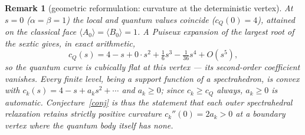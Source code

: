 \documentclass[11pt]{article}
\newtheorem{remark}[theorem]{Remark}
\begin{document}
\begin{remark}[geometric reformulation: curvature at the deterministic vertex]
At $s=0$ ($\alpha=\beta=1$) the local and quantum values coincide ($c_Q(0)=4$),
attained on the classical face $\langle A_0\rangle=\langle B_0\rangle=1$. A Puiseux
expansion of the largest root of the sextic gives, in exact arithmetic,
\[
  c_Q(s)=4-s+0\cdot s^2+\tfrac16 s^3-\tfrac1{36}s^4+O(s^5),
\]
so the quantum curve is \emph{cubically flat} at this vertex --- its second-order
coefficient vanishes. Every finite level, being a support function of a
spectrahedron, is convex with $c_k(s)=4-s+a_k s^2+\cdots$ and $a_k\ge0$; since
$c_k\ge c_Q$ always, $a_k\ge0$ is automatic. Conjecture~\ref{conj} is thus the
statement that each outer spectrahedral relaxation retains \emph{strictly positive
curvature} $c_k''(0)=2a_k>0$ at a boundary vertex where the quantum body itself has
none.


\end{remark}
\end{document}
